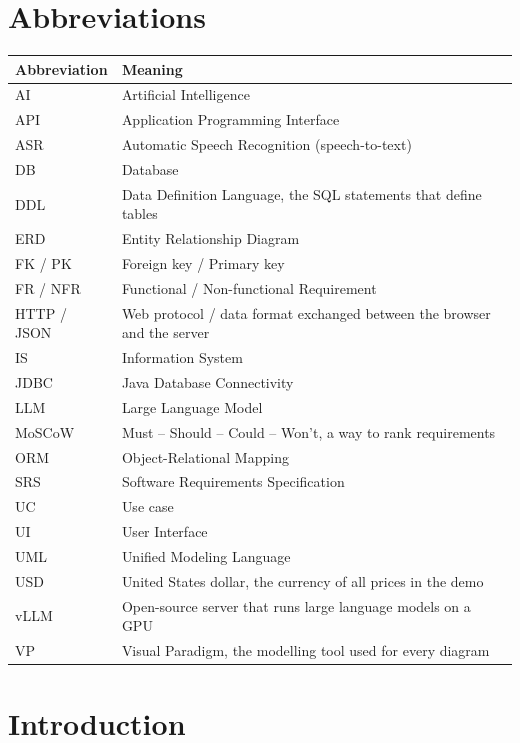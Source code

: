 

\chapter*{Abbreviations}
\begin{longtable}{@{}P{3.0cm}P{12.0cm}@{}}
\toprule
\textbf{Abbreviation} & \textbf{Meaning}\\
\midrule
\endhead
AI & Artificial Intelligence\\
API & Application Programming Interface\\
ASR & Automatic Speech Recognition (speech-to-text)\\
DB & Database\\
DDL & Data Definition Language, the SQL statements that define tables\\
ERD & Entity Relationship Diagram\\
FK / PK & Foreign key / Primary key\\
FR / NFR & Functional / Non-functional Requirement\\
HTTP / JSON & Web protocol / data format exchanged between the browser and the server\\
IS & Information System\\
JDBC & Java Database Connectivity\\
LLM & Large Language Model\\
MoSCoW & Must -- Should -- Could -- Won't, a way to rank requirements\\
ORM & Object-Relational Mapping\\
SRS & Software Requirements Specification\\
UC & Use case\\
UI & User Interface\\
UML & Unified Modeling Language\\
USD & United States dollar, the currency of all prices in the demo\\
vLLM & Open-source server that runs large language models on a GPU\\
VP & Visual Paradigm, the modelling tool used for every diagram\\
\bottomrule
\end{longtable}

\chapter*{Introduction}

